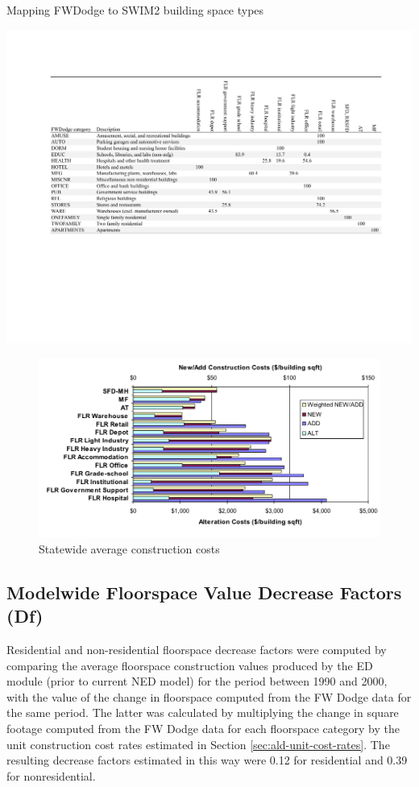 \begin{table}  %
\centering
\caption{Mapping FWDodge to SWIM2 building space types}\label{tab:building-space-mapping}
\includegraphics[scale=0.95, trim=28mm 70mm 20mm 32mm, clip]{ald/building-space-mapping} %
\end{table}

\begin{figure}
\centering
\includegraphics[scale=0.45]{ald/average-construction-costs}
\caption{Statewide average construction costs}\label{fig:average-construction-costs}
\end{figure}

\subsection{Modelwide Floorspace Value Decrease Factors (Df)}\label{sec:ald-floorspace-decrease-factors}   %
Residential and non-residential floorspace decrease factors were computed by comparing the average floorspace construction values produced by the ED module (prior to current NED model) for the period between 1990 and 2000, with the value of the change in floorspace computed from the FW Dodge data for the same period. The latter was calculated by multiplying the change in square footage computed from the FW Dodge data for each floorspace category by the unit construction cost rates estimated in Section \ref{sec:ald-unit-cost-rates}. The resulting decrease factors estimated in this way were 0.12 for residential and 0.39 for nonresidential.


